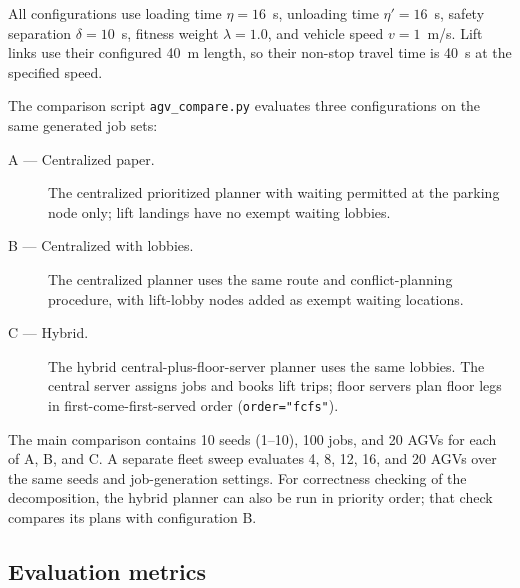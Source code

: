 \documentclass[11pt]{article}
\begin{document}
All configurations use loading time $\eta=16$~s, unloading time
$\eta'=16$~s, safety separation $\delta=10$~s, fitness weight $\lambda=1.0$,
and vehicle speed $v=1$~m/s. Lift links use their configured 40~m length, so
their non-stop travel time is 40~s at the specified speed.

The comparison script \texttt{agv\_compare.py} evaluates three configurations
on the same generated job sets:
\begin{description}
  \item[A --- Centralized paper.] The centralized prioritized planner with
        waiting permitted at the parking node only; lift landings have no
        exempt waiting lobbies.
  \item[B --- Centralized with lobbies.] The centralized planner uses the
        same route and conflict-planning procedure, with lift-lobby nodes
        added as exempt waiting locations.
  \item[C --- Hybrid.] The hybrid central-plus-floor-server planner uses the
        same lobbies. The central server assigns jobs and books lift trips;
        floor servers plan floor legs in first-come-first-served order
        (\texttt{order="fcfs"}).
\end{description}

The main comparison contains 10 seeds (1--10), 100 jobs, and 20 AGVs for each
of A, B, and C. A separate fleet sweep evaluates 4, 8, 12, 16, and 20 AGVs
over the same seeds and job-generation settings. For correctness checking of
the decomposition, the hybrid planner can also be run in priority order;
that check compares its plans with configuration B.

\subsection{Evaluation metrics}
\end{document}
